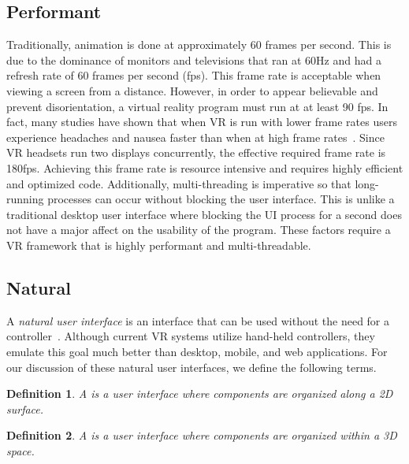 \documentclass[conference,12pt]{IEEEtran}
\newtheorem{definition}{Definition}
\begin{document}
\subsection{Performant}\label{sec:performant}

Traditionally, animation is done at approximately 60 frames per second.  This is due to
the dominance of monitors and televisions that ran at 60Hz and had a refresh rate of
60 frames per second (fps).  This frame rate is acceptable when viewing a screen from a
distance. However, in order to appear believable and prevent disorientation, a
virtual reality program must run at at least 90 fps. In fact, many studies have
shown that when VR is run with lower frame rates users experience headaches and
nausea faster than when at high frame rates~\cite{irisVR}. Since VR headsets run
two displays concurrently, the effective required frame rate is 180fps.
Achieving this frame rate is resource intensive and requires highly efficient
and optimized code. Additionally, multi-threading is imperative so that
long-running processes can occur without blocking the user interface. This is
unlike a traditional desktop user interface where blocking the UI process for a
second does not have a major affect on the usability of the program. These
factors require a VR framework that is highly performant and multi-threadable.

\subsection{Natural}\label{sec:natural}

A \textit{natural user interface} is an interface that can be used without the
need for a controller~\cite{Wimmers:2015:VR:Natural-UI}. Although current VR
systems utilize hand-held controllers, they emulate this goal much better than
desktop, mobile, and web applications. For our discussion of these natural user
interfaces, we define the following terms.

\begin{definition}\label{def:planar-ui}
    A {\normalfont{}} is a user interface where components are
    organized along a 2D surface.
\end{definition}

\begin{definition}\label{def:spacial-ui}
    A {\normalfont{}} is a user interface where components are
    organized within a 3D space.
\end{definition}
\end{document}
